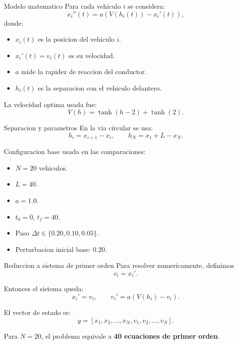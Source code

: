 \documentclass[aspectratio=169]{beamer}
\begin{document}
\begin{frame}{Modelo matematico}
  Para cada vehiculo $i$ se considera:
  \[
    x_i''(t) = a\left(V(h_i(t)) - x_i'(t)\right),
  \]
  donde:
  \begin{itemize}
    \item $x_i(t)$ es la posicion del vehiculo $i$.
    \item $x_i'(t)=v_i(t)$ es su velocidad.
    \item $a$ mide la rapidez de reaccion del conductor.
    \item $h_i(t)$ es la separacion con el vehiculo delantero.
  \end{itemize}

  La velocidad optima usada fue:
  \[
    V(h) = \tanh(h-2) + \tanh(2).
  \]
\end{frame}

\begin{frame}{Separacion y parametros}
  En la via circular se usa:
  \[
    h_i = x_{i+1} - x_i, \qquad
    h_N = x_1 + L - x_N.
  \]

  Configuracion base usada en las comparaciones:
  \begin{itemize}
    \item $N = 20$ vehiculos.
    \item $L = 40$.
    \item $a = 1.0$.
    \item $t_0 = 0$, $t_f = 40$.
    \item Paso $\Delta t \in \{0.20, 0.10, 0.05\}$.
    \item Perturbacion inicial base: $0.20$.
  \end{itemize}
\end{frame}

\begin{frame}{Reduccion a sistema de primer orden}
  Para resolver numericamente, definimos
  \[
    v_i = x_i'.
  \]

  Entonces el sistema queda:
  \[
    x_i' = v_i,
    \qquad
    v_i' = a\left(V(h_i) - v_i\right).
  \]

  El vector de estado es:
  \[
    y = [x_1, x_2, \dots, x_N, v_1, v_2, \dots, v_N].
  \]

  Para $N=20$, el problema equivale a \textbf{40 ecuaciones de primer orden}.
\end{frame}
\end{document}
